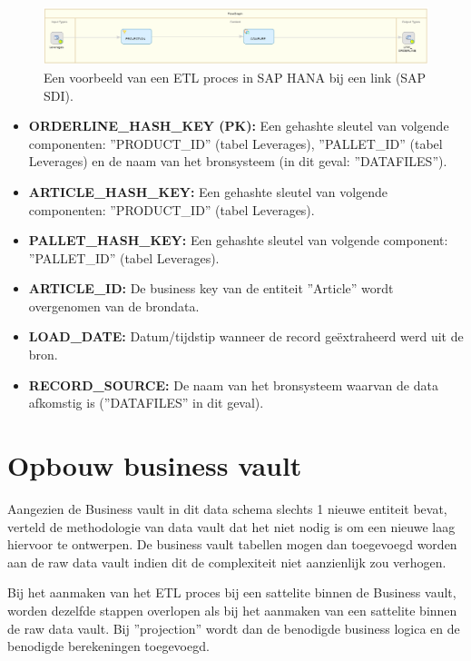\begin{figure}[h]
	\centering
	\includegraphics[scale=0.45]{../images/DV_FG_link.png}
	\caption{Een voorbeeld van een ETL proces in SAP HANA bij een link (SAP SDI).}
	\label{fig:etllink}
\end{figure}

\begin{itemize}
	\item \textbf{ORDERLINE\_HASH\_KEY (PK):} Een gehashte sleutel van volgende componenten: ''PRODUCT\_ID'' (tabel Leverages), ''PALLET\_ID'' (tabel Leverages)  en de naam van het bronsysteem (in dit geval: ''DATAFILES'').
	\item \textbf{ARTICLE\_HASH\_KEY:} Een gehashte sleutel van volgende componenten: ''PRODUCT\_ID'' (tabel Leverages).
	\item \textbf{PALLET\_HASH\_KEY:} Een gehashte sleutel van volgende component: ''PALLET\_ID'' (tabel Leverages).
	\item \textbf{ARTICLE\_ID:} De business key van de entiteit ''Article'' wordt overgenomen van de brondata.
	\item \textbf{LOAD\_DATE:} Datum/tijdstip wanneer de record geëxtraheerd werd uit de bron.
	\item \textbf{RECORD\_SOURCE:} De naam van het bronsysteem waarvan de data afkomstig is (''DATAFILES'' in dit geval).
\end{itemize}

\section{Opbouw business vault}
Aangezien de Business vault in dit data schema slechts 1 nieuwe entiteit bevat, verteld de methodologie van data vault dat het niet nodig is om een nieuwe laag hiervoor te ontwerpen. De business vault tabellen mogen dan toegevoegd worden aan de raw data vault indien dit de complexiteit niet aanzienlijk zou verhogen.

Bij het aanmaken van het ETL proces bij een sattelite binnen de Business vault, worden dezelfde stappen overlopen als bij het aanmaken van een sattelite binnen de raw data vault. Bij ''projection'' wordt dan de benodigde business logica en de benodigde berekeningen toegevoegd.

